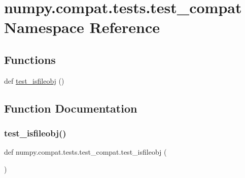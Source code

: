 \hypertarget{namespacenumpy_1_1compat_1_1tests_1_1test__compat}{}\section{numpy.\+compat.\+tests.\+test\+\_\+compat Namespace Reference}
\label{namespacenumpy_1_1compat_1_1tests_1_1test__compat}
\subsection*{Functions}
\begin{DoxyCompactItemize}
\item 
def \hyperlink{namespacenumpy_1_1compat_1_1tests_1_1test__compat_a91ecec14abfec156981520b4404b7439}{test\+\_\+isfileobj} ()
\end{DoxyCompactItemize}


\subsection{Function Documentation}
\mbox{\label{namespacenumpy_1_1compat_1_1tests_1_1test__compat_a91ecec14abfec156981520b4404b7439}} 
\subsubsection{\texorpdfstring{test\+\_\+isfileobj()}{test\_isfileobj()}}
{\footnotesize\ttfamily def numpy.\+compat.\+tests.\+test\+\_\+compat.\+test\+\_\+isfileobj (\begin{DoxyParamCaption}{ }\end{DoxyParamCaption})}

